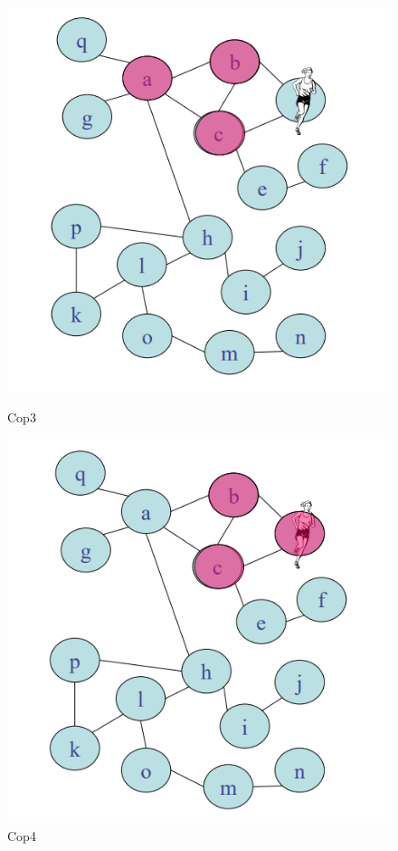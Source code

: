 \begin{figure}[H]
    \centering
    \begin{minipage}[b]{0.45\linewidth}
        \includegraphics[width=\linewidth]{chapters/images/cop3.png}
        \caption{Cop3}
        \label{fig:5}
    \end{minipage}
    \hspace{0.5cm}
    \begin{minipage}[b]{0.45\linewidth}
        \includegraphics[width=\linewidth]{chapters/images/cop4.png}
        \caption{Cop4}
        \label{fig:6}
    \end{minipage}
\end{figure}

